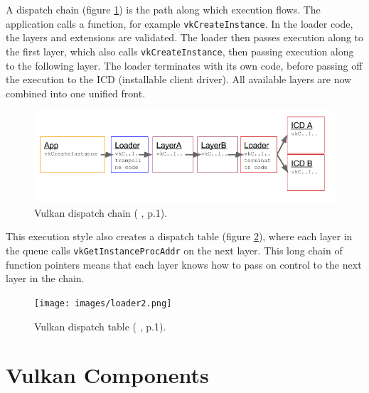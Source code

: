 \documentclass[12pt]{report}
\newcommand{\citediagram}[2]{(\citeauthor{#1} \citeyear{#1}, p.#2)}
\theoremstyle{definition}
\begin{document}
      A dispatch chain (figure \ref{fig:loader1}) is the path along which execution flows. The application
      calls a function, for example \texttt{vkCreateInstance}. In the loader code, the
      layers and extensions are validated. The loader then passes execution
      along to the first layer, which also calls \texttt{vkCreateInstance}, then
      passing execution along to the following layer. The loader terminates
      with its own code, before passing off the execution to the ICD
      (installable client driver). All available layers are now combined
      into one unified front.

      \begin{figure}[h]
        \centering
        \includegraphics[width=\textwidth]{images/loader1.png}
        \caption{Vulkan dispatch chain \citediagram{renderdoc}{1}.}
        \label{fig:loader1}  
      \end{figure}

      This execution style also creates a dispatch table (figure \ref{fig:loader2}), where each layer in
      the queue calls \texttt{vkGetInstanceProcAddr} on the next layer. This long
      chain of function pointers means that each layer knows how to pass on
      control to the next layer in the chain. 


      \begin{figure}[h]
        \centering
        \texttt{[image: images/loader2.png]}
        \caption{Vulkan dispatch table \citediagram{renderdoc}{1}.}
        \label{fig:loader2}  
      \end{figure}

    \section{Vulkan Components}
\end{document}
